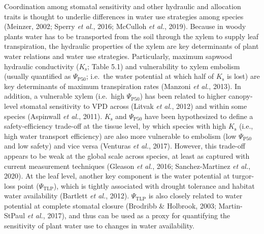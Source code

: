 \documentclass[11pt,twoside]{reedthesis}
\begin{document}
Coordination among stomatal sensitivity and other hydraulic and
allocation traits is thought to underlie differences in water use
strategies among species (Meinzer, 2002; Sperry \emph{et al.}, 2016;
McCulloh \emph{et al.}, 2019). Because in woody plants water has to be
transported from the soil through the xylem to supply leaf
transpiration, the hydraulic properties of the xylem are key
determinants of plant water relations and water use strategies.
Particularly, maximum sapwood hydraulic conductivity (\(K_\text{s}\);
Table 5.1) and vulnerability to xylem embolism (usually quantified as
\(\Psi_{\text{P50}}\); i.e.~the water potential at which half of
\(K_\text{s}\) is lost) are key determinants of maximum transpiration
rates (Manzoni \emph{et al.}, 2013). In addition, a vulnerable xylem
(i.e.~high \textbar{}\(\Psi_{\text{P50}}\)\textbar{}) has been related
to higher canopy-level stomatal sensitivity to VPD across (Litvak
\emph{et al.}, 2012) and within some species (Aspinwall \emph{et al.},
2011). \(K_\text{s}\) and \(\Psi_{\text{P50}}\) have been hypothesized
to define a safety-efficiency trade-off at the tissue level, by which
species with high \(K_\text{s}\) (i.e., high water transport efficiency)
are also more vulnerable to embolism (low
\textbar{}\(\Psi_{\text{P50}}\)\textbar{} and low safety) and vice versa
(Venturas \emph{et al.}, 2017). However, this trade-off appears to be
weak at the global scale across species, at least as captured with
current measurement techniques (Gleason \emph{et al.}, 2016;
Sanchez-Martinez \emph{et al.}, 2020). At the leaf level, another key
component is the water potential at turgor-loss point
(\(\Psi_{\text{TLP}}\)), which is tightly associated with drought
tolerance and habitat water availability (Bartlett \emph{et al.}, 2012).
\(\Psi_{\text{TLP}}\) is also closely related to water potential at
complete stomatal closure (Brodribb \& Holbrook, 2003; Martin-StPaul
\emph{et al.}, 2017), and thus can be used as a proxy for quantifying
the sensitivity of plant water use to changes in water availability.\par
\end{document}
